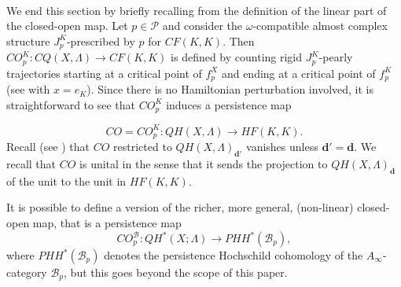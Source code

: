 \  

We end this section by briefly recalling from \cite{Bi-Co:rigidity} the definition of the linear part of the closed-open map. Let $p\in \mathcal{P}$ and consider the $\omega$-compatible almost complex structure $J_p^K$-prescribed by $p$ for $CF(K,K)$. Then $CO_p^K\colon CQ(X,\Lambda)\to CF(K,K)$ is defined by counting rigid $J_p^K$-pearly trajectories starting at a critical point of $f_p^X$ and ending at a critical point of $f^K_p$ (see \cite[Figure 3]{Bi-Co:Yasha-fest} with $x=e_K$). Since there is no Hamiltonian perturbation involved, it is straightforward to see that $CO_p^K$ induces a persistence map 

\begin{equation}\label{eq:co_map}
CO=CO_p^K\colon QH(X,\Lambda)\to HF(K,K).
\end{equation} Recall (see \cite[Proposition 2.9]{she:fanofuk}) that $CO$ restricted to $QH(X,\Lambda)_{\mathbf{d}'}$ vanishes unless $\mathbf{d}'=\mathbf{d}$. We recall that $CO$ is unital in the sense that it sends the projection to $QH(X,\Lambda)_{\mathbf{d}}$ of the unit to the unit in $HF(K,K)$.

\begin{rem}
	It is possible to define a version of the richer, more general, (non-linear) closed-open map, that is a persistence map $$CO^\mathcal{B}_p\colon QH^*(X;\Lambda)\to PHH^*(\mathcal{B}_p),$$ where $PHH^*(\mathcal{B}_p)$ denotes the persistence Hochschild cohomology of the $A_\infty$-category $\mathcal{B}_p$, but this goes beyond the scope of this paper.%
\end{rem}



